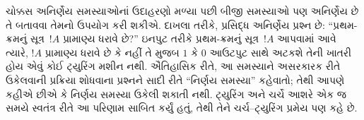 ચોક્કસ અનિર્ણેય સમસ્યાઓનાં ઉદાહરણો મળ્યા પછી બીજી
સમસ્યાઓ પણ અનિર્ણેય છે તે બતાવવા તેમનો ઉપયોગ
કરી શકીએ. દાખલા તરીકે, પ્રસિદ્ધ અનિર્ણેય પ્રશ્ન છે:
``પ્રથમ-ક્રમનું સૂત્ર~$!A$ પ્રામાણ્ય ધરાવે છે?''
ઇનપુટ તરીકે પ્રથમ-ક્રમનું સૂત્ર~$!A$ આપવામાં આવે
ત્યારે, $!A$ પ્રામાણ્ય ધરાવે છે કે નહીં તે મુજબ $1$ કે
$0$ આઉટપુટ સાથે અટકશે તેની ખાતરી હોય એવું કોઈ ટ્યુરિંગ
મશીન નથી. ઐતિહાસિક રીતે, આ સમસ્યાને અસરકારક રીતે
ઉકેલવાની પ્રક્રિયા શોધવાના પ્રશ્નને સાદી રીતે ``નિર્ણય
સમસ્યા'' કહેવાતો; તેથી આપણે કહીએ છીએ કે નિર્ણય સમસ્યા
ઉકેલી શકાતી નથી. ટ્યુરિંગ અને ચર્ચે આશરે એક જ સમયે સ્વતંત્ર
રીતે આ પરિણામ સાબિત કર્યું હતું, તેથી તેને ચર્ચ--ટ્યુરિંગ
પ્રમેય પણ કહે છે.
\endgroup


\begingroup
\makeatletter{}\makeatother

\label{guunit:OLP-0266}


